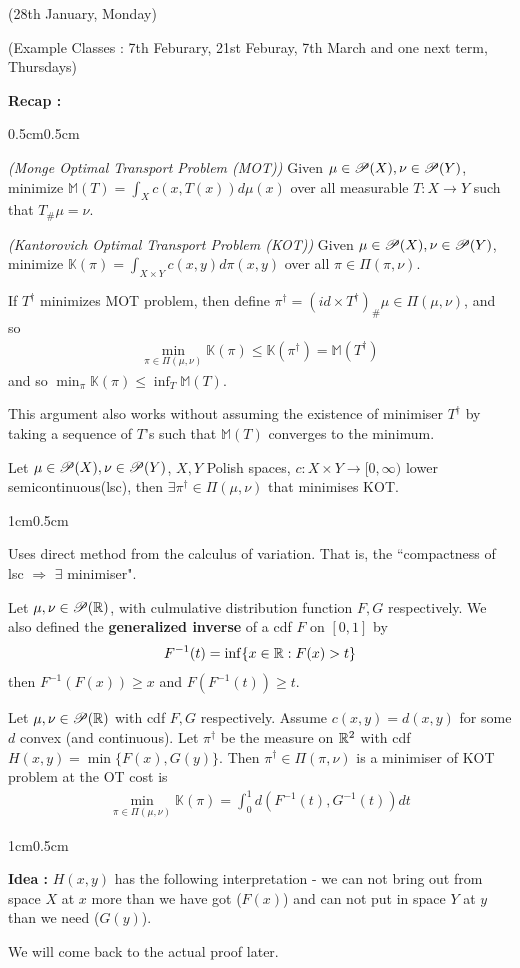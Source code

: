 \documentclass[12pt,a4paper]{article}
\newenvironment{proof}
{\begin{changemargin}{1cm}{0.5cm} 
	}%
	{\end{changemargin}
}
\newenvironment{subproof}
{\begin{changemargin}{0.5cm}{0.5cm} 
	}%
	{\end{changemargin}
}
\newenvironment{p}
{\begin{proof} 
	}%
	{\end{proof}
}
\begin{document}
\newday

(28th January, Monday)
\s

(Example Classes : 7th Feburary, 21st Feburay, 7th March and one next term, Thursdays)
\s

\textbf{Recap :}
\begin{subproof}
 \emph{(Monge Optimal Transport Problem (MOT))} Given $\mu \in \mathscr{P}(X), \nu\in \mathscr{P}(Y)$, minimize $\mathbb{M}(T) =\int_X c(x, T(x)) d\mu(x)$ over all measurable $T:X\rightarrow Y$ such that $T_{\#} \mu = \nu$.

 \emph{(Kantorovich Optimal Transport Problem (KOT))} Given $\mu\in \mathscr{P}(X),\nu\in\mathscr{P}(Y)$, minimize $\mathbb{K}(\pi) = \int_{X\times Y} c(x,y) d\pi(x,y)$ over all $\pi \in \Pi(\pi, \nu)$.
\s

If $T^{\dagger}$ minimizes MOT problem, then define $\pi^{\dagger} = (id \times T^{\dagger})_{\#} \mu \in \Pi(\mu, \nu)$, and so
\begin{align*}
\min_{\pi \in \Pi(\mu, \nu)} \mathbb{K}(\pi) \leq \mathbb{K}(\pi^{\dagger}) = \mathbb{M}(T^{\dagger})
\end{align*}
and so $\min_{\pi} \mathbb{K}(\pi) \leq \inf_T \mathbb{M}(T)$.

\quad This argument also works without assuming the existence of minimiser $T^{\dagger}$ by taking a sequence of $T$'s such that $\mathbb{M}(T)$ converges to the minimum.
\s

 Let $\mu \in \mathscr{P}(X),\nu\in\mathscr{P}(Y)$, $X,Y$ Polish spaces, $c:X\times Y \rightarrow [0, \infty)$ lower semicontinuous(lsc), then $\exists \pi^{\dagger} \in \Pi(\mu, \nu)$ that minimises KOT.
\begin{p}
\pf Uses direct method from the calculus of variation. That is, the ``compactness of lsc $\Rightarrow$ $\exists$ minimiser".
\end{p}
\end{subproof}
\s

Let $\mu, \nu \in \mathscr{P}(\mathbb{R})$, with culmulative distribution function $F,G$ respectively. We also defined the \textbf{generalized inverse} of a cdf $F$ on $[0,1]$ by
\begin{align*}
F^{-1}(t) = \inf \{x\in \mathbb{R} : F(x) > t\}
\end{align*}
then $F^{-1}(F(x))\geq x$ and $F(F^{-1}(t)) \geq t$.
\s

 Let $\mu, \nu \in\mathscr{P}(\mathbb{R})$ with cdf $F,G$ respectively. Assume $c(x,y) =d(x,y)$ for some $d$ convex (and continuous).  Let $\pi^{\dagger}$ be the measure on $\mathbb{R}^2$ with cdf $H(x,y) = \min\{F(x), G(y)\}$. Then $\pi^{\dagger} \in \Pi(\pi, \nu)$ is a minimiser of KOT problem at the OT cost is
\begin{align*}
\min_{\pi \in \Pi(\mu, \nu)} \mathbb{K}(\pi) = \int_0^1 d(F^{-1}(t), G^{-1}(t))dt
\end{align*}
\begin{p}
\textbf{Idea :} $H(x,y)$ has the following interpretation - we can not bring out from space $X$ at $x$ more than we have got ($F(x)$) and can not put in space $Y$ at $y$ than we need ($G(y)$).

\quad We will come back to the actual proof later.
\end{p}
\s
\end{document}
